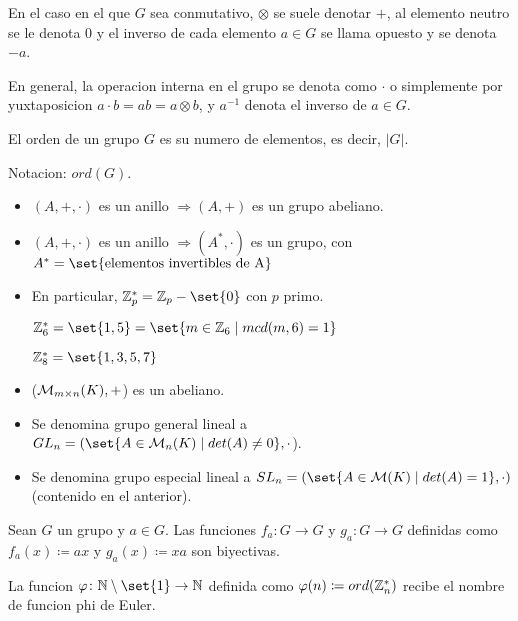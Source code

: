 En el caso en el que \(G \) sea conmutativo, \(\otimes \) se suele denotar \(+ \), al elemento neutro se le denota \(0 \) y el inverso de cada elemento \(a \in G \) se llama opuesto y se denota \(-a \).

En general, la operacion interna en el grupo se denota como \(\cdot \) o simplemente por yuxtaposicion \(a \cdot b = ab = a \otimes b \), y \(a^{-1}  \) denota el inverso de \(a \in G \).

\begin{definition}
	El orden de un grupo \(G \) es su numero de elementos, es decir, \(\left\vert G  \right\vert \).
	
	Notacion: \(ord(G)\).
\end{definition}
\begin{example}
	\begin{itemize}
		\item \((A, +, \cdot )\) es un anillo \(\Rightarrow (A, + )\) es un grupo abeliano.
		\item \((A, +, \cdot )\) es un anillo \(\Rightarrow (A^{*}, \cdot )\) es un grupo, con \(A^{*} = \set{\text{elementos invertibles de A} }\)
		\item En particular, \(\Z^{*}_p = \Z_p - \set{0}\) con \(p \) primo.
		      
		      \(\Z^{*}_6 = \set{1,5} = \set{m \in \Z_6 \mid mcd(m,6)= 1}\)
		      
		      \(\Z^{*}_8 = \set{1,3,5,7} \)
		\item (\(\mathcal{\MakeUppercase{m}}_{m\times n}(K), + \)) es un abeliano.
		\item Se denomina grupo general lineal a \( GL_n = (\set{A \in \mathcal{\MakeUppercase{m}}_n (K) \mid det(A) \neq 0}, \cdot\)).
		\item Se denomina grupo especial lineal a \(SL_n = (\set{A \in \mathcal{\MakeUppercase{m}}(K) \mid det(A) = 1}, \cdot)\) (contenido en el anterior).
	\end{itemize}
\end{example}
\begin{proposition}
	Sean \(G \) un grupo y \(a \in G \). Las funciones \(f_a \colon G \to G \) y \(g_a \colon G \to G \) definidas como \(f_a(x) \coloneqq ax \) y \(g_a (x) \coloneqq xa \) son biyectivas.
\end{proposition}
\begin{definition}
	La funcion \(\varphi \colon \N \setminus \set{1 } \to \N \) definida como \(\varphi(n) \coloneqq ord(\mathbb{Z}^{*}_n )\) recibe el nombre de funcion phi de Euler.
\end{definition}
